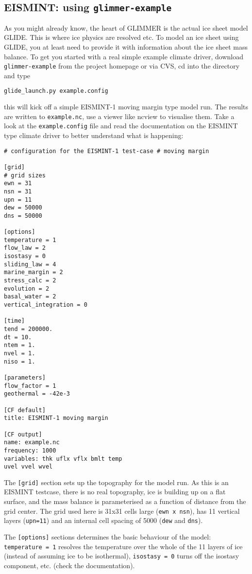 
\subsection{EISMINT: using \texttt{glimmer-example}}
As you might already know, the heart of GLIMMER is the actual ice sheet model
GLIDE. This is where ice physics are resolved etc. To model an ice sheet using
GLIDE, you at least need to provide it with information about the ice sheet
mass balance. To get you started with a real simple example climate driver,
download \texttt{glimmer-example} from the project homepage or via CVS, cd into
the directory and type
\begin{verbatim}
glide_launch.py example.config
\end{verbatim}
this will kick off a simple EISMINT-1 moving margin type model run. The results
are written to \texttt{example.nc}, use a viewer like ncview to visualise them.
Take a look at the \texttt{example.config} file and read the documentation on
the EISMINT type climate driver to better understand what is happening:

\begin{verbatim}
# configuration for the EISMINT-1 test-case # moving margin

[grid]
# grid sizes
ewn = 31
nsn = 31
upn = 11
dew = 50000
dns = 50000

[options]
temperature = 1
flow_law = 2
isostasy = 0
sliding_law = 4
marine_margin = 2
stress_calc = 2
evolution = 2
basal_water = 2
vertical_integration = 0

[time]
tend = 200000.
dt = 10.
ntem = 1.
nvel = 1.
niso = 1.

[parameters]
flow_factor = 1
geothermal = -42e-3

[CF default]
title: EISMINT-1 moving margin

[CF output]
name: example.nc
frequency: 1000
variables: thk uflx vflx bmlt temp
uvel vvel wvel
\end{verbatim}

The \texttt{[grid]} section sets up the topography for the model run. As this
is an EISMINT testcase, there is no real topography, ice is building up on a
flat surface, and the mass balance is parameterised as a function of distance
from the grid center. The grid used here is 31x31 cells large (\texttt{ewn x
nsn}), has 11 vertical layers (\texttt{upn=11}) and an internal cell spacing of
5000 (\texttt{dew} and \texttt{dns}).

The \texttt{[options]} sections determines the basic behaviour of the model:\\
\texttt{temperature = 1} resolves the temperature over the whole of the 11
layers of ice (instead of assuming ice to be isothermal), \texttt{isostasy = 0}
turns off the isostasy component, etc. (check the documentation).


